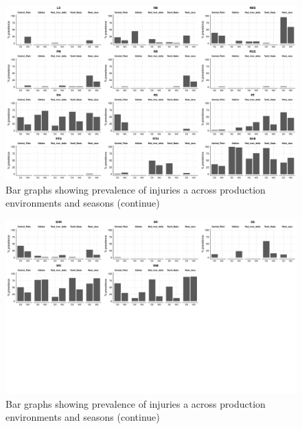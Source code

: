     \begin{landscape}\begin{figure}\centering\includegraphics[height = 1\textwidth]{figures/barplot2.pdf}\caption{Bar graphs showing  prevalence of injuries a across production environments and seasons (continue)}\end{figure}\end{landscape} 

    
        \begin{landscape}\begin{figure}\centering\includegraphics[height = 1\textwidth]{figures/barplot3.pdf}\caption{Bar graphs showing  prevalence of injuries a across production environments and seasons (continue)}\end{figure}        \end{landscape} 

